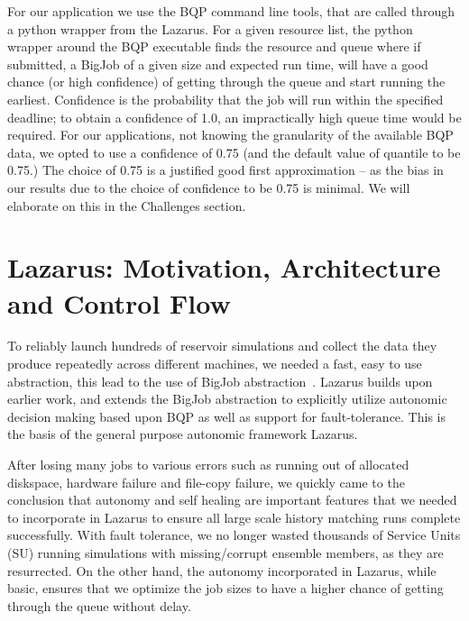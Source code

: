 \documentclass{sig-alternate}
\newcommand{\jhanote}[1]{ {\textcolor{red} { ***Jha: #1 }}}
\newcommand{\yyenote}[1]{ {\textcolor{blue} { ***yye00: #1 }}}
\newcommand{\jhanote}[1]{}
\newcommand{\yyenote}[1]{}
\begin{document}
For our application we use the BQP command line tools, that are called
through a python wrapper from the Lazarus.  For a given resource list,
the python wrapper around the BQP executable finds the resource and
queue where if submitted, a BigJob of a given size and expected run
time, will have a good chance (or high confidence) of getting through
the queue and start running the earliest. Confidence is the
probability that the job will run within the specified deadline; to
obtain a confidence of 1.0, an impractically high queue time would be
required. For our applications, not knowing the granularity of the
available BQP data, we opted to use a confidence of 0.75 (and the
default value of quantile to be 0.75.)  The choice of 0.75 is a
justified good first approximation -- as the bias in our results due
to the choice of confidence to be 0.75 is minimal. We will elaborate
on this in the Challenges section.



\section{Lazarus: Motivation, Architecture and Control Flow}


To reliably launch hundreds of reservoir simulations and collect the
data they produce repeatedly across different machines, we needed a
fast, easy to use abstraction, this lead to the use of BigJob
abstraction~\cite{saga_royalsoc}.  Lazarus builds upon earlier work,
and extends the BigJob abstraction to explicitly utilize autonomic
decision making based upon BQP as well as support for
fault-tolerance. This is the basis of the general purpose autonomic
framework Lazarus.

After losing many jobs to various errors such as running out of allocated diskspace, hardware failure and file-copy failure, we quickly came to the conclusion that autonomy and self healing are important features that we needed to incorporate in Lazarus to ensure all large scale history matching runs complete successfully. With fault tolerance, we no longer wasted thousands of Service Units (SU) running simulations with missing/corrupt ensemble members, as they are resurrected.  On the other hand, the autonomy incorporated in Lazarus, while basic, ensures that we optimize the job sizes to have a higher chance of getting through the queue without delay.
\end{document}
